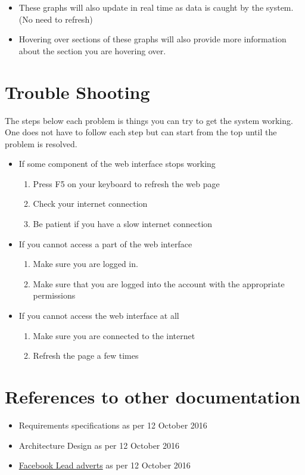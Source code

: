\documentclass{article}
\begin{document}
			\begin{itemize}
				\item These graphs will also update in real time as data is caught by the system. (No need to refresh)
				\item Hovering over sections of these graphs will also provide more information about the section you are hovering over.
			\end{itemize}

	\section{Trouble Shooting}
		The steps below each problem is things you can try to get the system working.
		One does not have to follow each step but can start from the top until the problem is resolved.
		\begin{itemize}
			\item If some component of the web interface stops working
				\begin{enumerate}
					\item Press F5 on your keyboard to refresh the web page
					\item Check your internet connection
					\item Be patient if you have a slow internet connection
				\end{enumerate}
			\item If you cannot access a part of the web interface
				\begin{enumerate}
					\item Make sure you are logged in.
					\item Make sure that you are logged into the account with the appropriate permissions
				\end{enumerate}
			\item If you cannot access the web interface at all
				\begin{enumerate}
					\item Make sure you are connected to the internet
					\item Refresh the page a few times
				\end{enumerate}
		\end{itemize}

	\section{References to other documentation}
		\begin{itemize}
			\item{Requirements specifications as per 12 October 2016}
			\item{Architecture Design as per 12 October 2016}
			\item{\href{https://www.facebook.com/business/a/lead-ads}{Facebook Lead adverts} as per 12 October 2016}
		\end{itemize}
\end{document}
